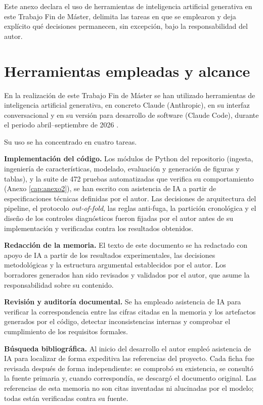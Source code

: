 \begin{sloppypar}

Este anexo declara el uso de herramientas de inteligencia artificial generativa en este
Trabajo Fin de Máster, delimita las tareas en que se emplearon y deja explícito qué
decisiones permanecen, sin excepción, bajo la responsabilidad del autor.

\section{Herramientas empleadas y alcance}\label{sec:ia_herramientas}

En la realización de este Trabajo Fin de Máster se han utilizado herramientas de
inteligencia artificial generativa, en concreto Claude (Anthropic), en su interfaz
conversacional y en su versión para desarrollo de software (Claude Code), durante el
periodo abril--septiembre de 2026 \parencite{anthropic2026claude,anthropic2026claudecode}.

Su uso se ha concentrado en cuatro tareas.

\textbf{Implementación del código.} Los módulos de Python del repositorio (ingesta,
ingeniería de características, modelado, evaluación y generación de figuras y tablas), y
la suite de 472 pruebas automatizadas que verifica su comportamiento (Anexo
\ref{cap:anexo2}), se han escrito con asistencia de IA a partir de especificaciones
técnicas definidas por el autor. Las decisiones de arquitectura del pipeline, el protocolo
\emph{out-of-fold}, las reglas anti-fuga, la partición cronológica y el diseño de los
controles diagnósticos fueron fijadas por el autor antes de su implementación y
verificadas contra los resultados obtenidos.

\textbf{Redacción de la memoria.} El texto de este documento se ha redactado con apoyo
de IA a partir de los resultados experimentales, las decisiones metodológicas y la
estructura argumental establecidos por el autor. Los borradores generados han sido
revisados y validados por el autor, que asume la responsabilidad sobre su contenido.

\textbf{Revisión y auditoría documental.} Se ha empleado asistencia de IA para verificar
la correspondencia entre las cifras citadas en la memoria y los artefactos generados por
el código, detectar inconsistencias internas y comprobar el cumplimiento de los
requisitos formales.

\textbf{Búsqueda bibliográfica.} Al inicio del desarrollo el autor empleó asistencia de
IA para localizar de forma expeditiva las referencias del proyecto. Cada ficha fue
revisada después de forma independiente: se comprobó su existencia, se consultó la fuente
primaria y, cuando correspondía, se descargó el documento original. Las referencias de
esta memoria no son citas inventadas ni alucinadas por el modelo; todas están verificadas
contra su fuente.


\end{sloppypar}
